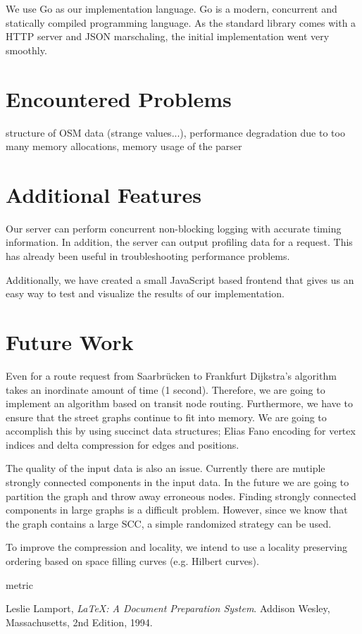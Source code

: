 \documentclass[a4paper]{article}
\begin{document}
We use Go as our implementation language.
Go is a modern, concurrent and statically compiled programming language.
As the standard library comes with a HTTP server and JSON marschaling,
the initial implementation went very smoothly.

\section{Encountered Problems}
structure of OSM data (strange values...),
performance degradation due to too many memory allocations,
memory usage of the parser

\section{Additional Features}

Our server can perform concurrent non-blocking logging with accurate timing information.
In addition, the server can output profiling data for a request.
This has already been useful in troubleshooting performance problems.

Additionally, we have created a small JavaScript based frontend that 
gives us an easy way to test and visualize the results of our implementation.

\section{Future Work}

Even for a route request from Saarbrücken to Frankfurt Dijkstra's algorithm takes an inordinate amount of time (1 second).
Therefore, we are going to implement an algorithm based on transit node routing.
Furthermore, we have to ensure that the street graphs continue to fit into memory.
We are going to accomplish this by using succinct data structures;
Elias Fano encoding for vertex indices and delta compression for edges and positions.

The quality of the input data is also an issue.
Currently there are mutiple strongly connected components in the input data.
In the future we are going to partition the graph and throw away erroneous nodes.
Finding strongly connected components in large graphs is a difficult problem.
However, since we know that the graph contains a large SCC,
a simple randomized strategy can be used.

To improve the compression and locality, we intend to use a locality preserving ordering based on space filling curves
(e.g. Hilbert curves).  

metric

\begin{thebibliography}{9}

  Leslie Lamport,
  \emph{\LaTeX: A Document Preparation System}.
  Addison Wesley, Massachusetts,
  2nd Edition,
  1994.

\end{thebibliography}
\end{document}
